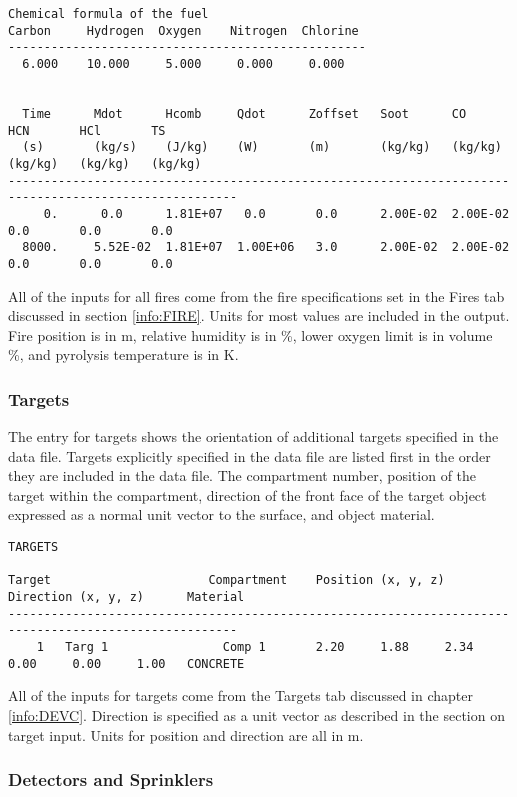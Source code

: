 \begin{lstlisting}[basicstyle=\tiny]
Chemical formula of the fuel
Carbon     Hydrogen  Oxygen    Nitrogen  Chlorine
--------------------------------------------------
  6.000    10.000     5.000     0.000     0.000


  Time      Mdot      Hcomb     Qdot      Zoffset   Soot      CO        HCN       HCl       TS
  (s)       (kg/s)    (J/kg)    (W)       (m)       (kg/kg)   (kg/kg)   (kg/kg)   (kg/kg)   (kg/kg)
------------------------------------------------------------------------------------------------------
     0.      0.0      1.81E+07   0.0       0.0      2.00E-02  2.00E-02   0.0       0.0       0.0
  8000.     5.52E-02  1.81E+07  1.00E+06   3.0      2.00E-02  2.00E-02   0.0       0.0       0.0
\end{lstlisting}
All of the inputs for all fires come from the fire specifications set in the Fires tab discussed in section \ref{info:FIRE}.  Units for most values are included in the output.  Fire position is in m, relative humidity is in \%, lower oxygen limit is in volume \%, and pyrolysis temperature is in K.


\subsubsection{Targets}

The entry for targets shows the orientation of additional targets specified in the data file. Targets explicitly specified in the data file are listed first in the order they are included in the data file. The compartment number, position of the target within the compartment, direction of the front face of the target object expressed as a normal unit vector to the surface, and object material.

\begin{lstlisting}[basicstyle=\tiny]
TARGETS

Target                      Compartment    Position (x, y, z)         Direction (x, y, z)      Material
------------------------------------------------------------------------------------------------------
    1   Targ 1                Comp 1       2.20     1.88     2.34     0.00     0.00     1.00   CONCRETE
\end{lstlisting}

All of the inputs for targets come from the Targets tab discussed in chapter \ref{info:DEVC}. Direction is specified as a unit vector as described in the section on target input. Units for position and direction are all in m.

\subsubsection{Detectors and Sprinklers}

